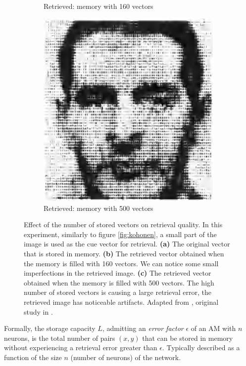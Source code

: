\documentclass[runningheads]{llncs}
\begin{document}
\begin{figure}[htbp]
\begin{subfigure}[t]{0.3\textwidth}
         \caption{Retrieved: memory with 160 vectors}
         \label{kohonen2B}
     \end{subfigure}
     \hfill
     \begin{subfigure}[t]{0.3\textwidth}
         \centering
         \includegraphics[width=\textwidth]{img/kohonenD.png}
         \caption{Retrieved: memory with 500 vectors}
         \label{kohonen2C}
     \end{subfigure}
        \caption{Effect of the number of stored vectors on retrieval quality. In this experiment, similarly to figure \ref{fig:kohonen}, a small part of the image is used as the cue vector for retrieval. \textbf{(a)} The original vector that is stored in memory. \textbf{(b)} The retrieved vector obtained when the memory is filled with 160 vectors. We can notice some small imperfections in the retrieved image. \textbf{(c)} The retrieved vector obtained when the memory is filled with 500 vectors. The high number of stored vectors is causing a large retrieval error, the retrieved image has noticeable artifacts. Adapted from \cite{kohonen2012self}, original study in \cite{kohonen1977principle}.}
        \label{fig:kohonen2}
\end{figure}
    
Formally, the storage capacity $L$, admitting an \textit{error factor} $\epsilon$ of an AM with $n$ neurons, is the total number of pairs $(x,y)$ that can be stored in memory without experiencing a retrieval error greater than $\epsilon$. Typically described as a function of the size $n$ (number of neurons) of the network.
\end{document}
